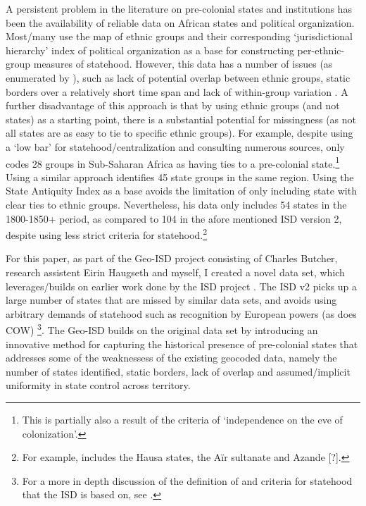 \documentclass[12pt]{article}
\begin{document}
A persistent problem in the literature on pre-colonial states and institutions
has been the availability of reliable data on African states and political
organization. Most/many use the \citet{Murdock1967} map of ethnic groups and
their corresponding `jurisdictional hierarchy' index of political organization
as a base for constructing per-ethnic-group measures of statehood. However, this
data has a number of issues (as enumerated by \citet{Michalopoulos2018}), such
as lack of potential overlap between ethnic groups, static borders over a
relatively short time span and lack of within-group variation
\citep{Michalopoulos2018}. A further disadvantage of this approach is that by
using ethnic groups (and not states) as a starting point, there is a substantial
potential for missingness (as not all states are as easy to tie to specific
ethnic groups). For example, \citet{Paine2019} despite using a `low bar' for
statehood/centralization and consulting numerous sources, only codes 28 groups
in Sub-Saharan Africa as having ties to a pre-colonial state.\footnote{This is
partially also a result of the criteria of `independence on the eve of
colonization'.} Using a similar approach \citet{Wig2016} identifies 45 state
groups in the same region. Using the State Antiquity Index
\citep{Bockstette2012} as a base \citet{Depetris-Chauvin2016} avoids the
limitation of only including state with clear ties to ethnic groups.
Nevertheless, his data only includes 54 states in the 1800-1850+ period, as
compared to 104 in the afore mentioned ISD version 2, despite using less
strict criteria for statehood.\footnote{For example,
\citet{Depetris-Chauvin2016} includes the Hausa states, the Aïr sultanate and
Azande [?].}


For this paper, as part of the Geo-ISD project consisting of Charles Butcher,
research assistent Eirin Haugseth and myself, I created a novel data set, which
leverages/builds on earlier work done by the ISD project \citep{Butcher2020}.
The ISD v2 picks up a large number of states that are missed by similar data
sets, and avoids using arbitrary demands of statehood such as recognition by
European powers (as does COW) \citep{Butcher2020}\footnote{For a more in depth
	discussion of the definition of and criteria for statehood that the ISD
is based on, see \citet{Butcher2017}.}. The Geo-ISD builds on the original data
set by introducing an innovative method for capturing the historical presence of
pre-colonial states that addresses some of the weaknessess of the existing
geocoded data, namely the number of states identified, static borders, lack of
overlap and assumed/implicit uniformity in state control across territory.
\end{document}
